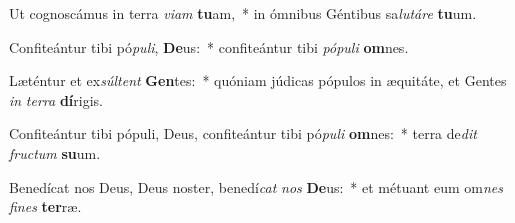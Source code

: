 \item Ut cognoscámus in terra \textit{vi}\textit{am} \textbf{tu}am,~* in ómnibus Géntibus sa\textit{lu}\textit{tá}\textit{re} \textbf{tu}um.
\item Confiteántur tibi pó\textit{pu}\textit{li}, \textbf{De}us:~* confiteántur tibi \textit{pó}\textit{pu}\textit{li} \textbf{om}nes.
\item Læténtur et ex\textit{súl}\textit{tent} \textbf{Gen}tes:~* quóniam júdicas pópulos in æquitáte, et Gentes \textit{in} \textit{ter}\textit{ra} \textbf{dí}rigis.
\item Confiteántur tibi pópuli, Deus, confiteántur tibi pó\textit{pu}\textit{li} \textbf{om}nes:~* terra de\textit{dit} \textit{fruc}\textit{tum} \textbf{su}um.
\item Benedícat nos Deus, Deus noster, benedí\textit{cat} \textit{nos} \textbf{De}us:~* et métuant eum om\textit{nes} \textit{fi}\textit{nes} \textbf{ter}ræ.
